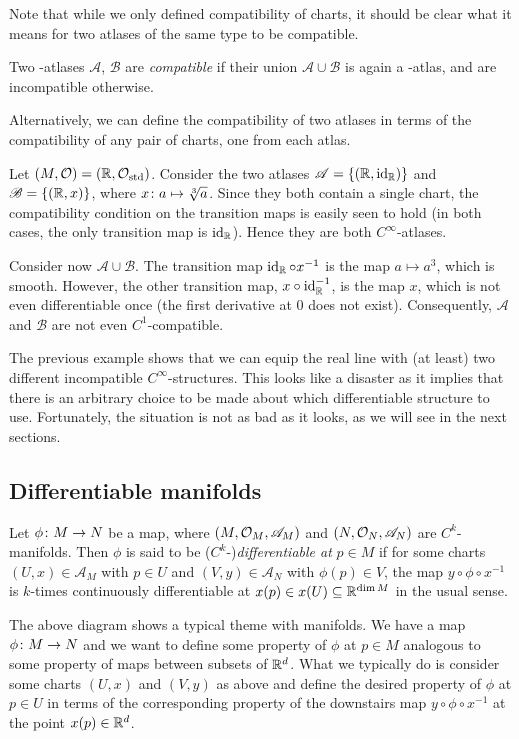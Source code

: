 Note that while we only defined compatibility of charts, it should be clear what it means for two atlases of the same type to be compatible.

\bd
Two {\scalebox{0.75}\FiveFlowerOpen}-atlases $\mathscr{A}$, $\mathscr{B}$ are \emph{compatible} if their union $\mathscr{A}\cup\mathscr{B}$ is again a {\scalebox{0.75}\FiveFlowerOpen}-atlas, and are incompatible otherwise.
\ed

Alternatively, we can define the compatibility of two atlases in terms of the compatibility of any pair of charts, one from each atlas.

\be
Let $(M,\mathcal{O})=(\mathbb{R},\mathcal{O}_\mathrm{std})$. Consider the two atlases $\mathscr{A}=\{(\mathbb{R},\operatorname{id}_{\mathbb{R}})\}$ and $\mathscr{B}=\{(\mathbb{R},x)\}$, where $x\colon a \mapsto \sqrt[3]{a}$. Since they both contain a single chart, the compatibility condition on the transition maps is easily seen to hold (in both cases, the only transition map is $\operatorname{id}_{\mathbb{R}}$). Hence they are both $C^\infty$-atlases.

Consider now $\mathscr{A}\cup\mathscr{B}$. The transition map $\operatorname{id}_{\mathbb{R}}\circ x^{-1}$ is the map $a\mapsto a^3$, which is smooth. However, the other transition map, $x\circ\operatorname{id}_{\mathbb{R}}^{-1}$, is the map $x$, which is not even differentiable once (the first derivative at $0$ does not exist). Consequently, $\mathscr{A}$ and $\mathscr{B}$ are not even $C^1$-compatible.
\ee

The previous example shows that we can equip the real line with (at least) two different incompatible $C^\infty$-structures. This looks like a disaster as it implies that there is an arbitrary choice to be made about which differentiable structure to use. Fortunately, the situation is not as bad as it looks, as we will see in the next sections.

\subsection{Differentiable manifolds}
\bd
Let $\phi\colon M\to N$ be a map, where $(M,\mathcal{O}_M,\mathscr{A}_M)$ and $(N,\mathcal{O}_N,\mathscr{A}_N)$ are $C^k$-manifolds. Then $\phi$ is said to be ($C^k$-)\emph{differentiable at} $p\in M$ if for some charts $(U,x)\in\mathscr{A}_M$ with $p\in U$ and $(V,y)\in\mathscr{A}_N$ with $\phi(p)\in V$, the map $y\circ\phi\circ x^{-1}$ is $k$-times continuously differentiable at $x(p)\in x(U)\subseteq\mathbb{R}^{\dim M}$ in the usual sense.
\bse
{}
\ese
\ed
The above diagram shows a typical theme with manifolds. We have a map $\phi\colon M\to N$ and we want to define some property of $\phi$ at $p\in M$ analogous to some property of maps between subsets of $\mathbb{R}^d$. What we typically do is consider some charts $(U,x)$ and $(V,y)$ as above and define the desired property of $\phi$ at $p\in U$ in terms of the corresponding property of the downstairs map $y\circ\phi\circ x^{-1}$ at the point $x(p)\in\mathbb{R}^d$.

